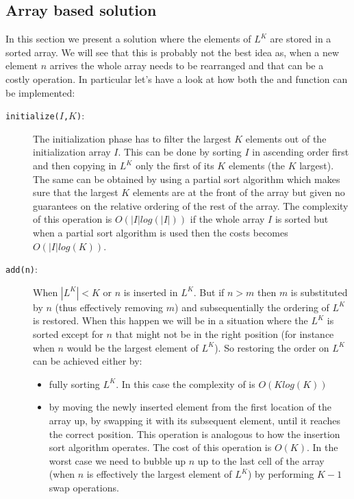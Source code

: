 \subsection{Array based solution}
\label{kth_largest_in_stream:sec:bruteforce}
In this section we present a solution where the elements of $L^K$ are stored in a sorted array. We
will see that this is probably not the best idea as, when a new element $n$ arrives the whole array
needs to be rearranged and that can be a costly operation. In particular let's have a look at how
both the  and  function can be implemented:
\begin{description}
	\item[\texttt{initialize($I$,$K$)}:] The initialization phase has to filter the largest $K$
	elements out of the initialization array $I$. This can be done by sorting $I$ in ascending order
	first  and then copying in $L^K$ only the first of its $K$ elements (the $K$ largest). The same
	can be obtained by using a partial sort algorithm which makes sure that  the largest $K$
	elements are at the front of the array but given no guarantees on the relative ordering of the
	rest of the array. The complexity of this operation is $O(|I| log(|I|))$ if the whole array $I$
	is sorted but when a partial sort algorithm is used then the costs becomes $O(|I| log(K))$.
	\item [\texttt{add(n)}:] When $|L^K|<K$ or  $n$ is inserted in $L^K$. But if $n>m$ then $m$ is
	 substituted by $n$ (thus effectively removing $m$) and subsequentially the ordering of $L^K$ is
	 restored. When this happen we will be in a situation where the $L^K$ is sorted except for $n$
	 that might not be in the right position (for instance when $n$ would be the largest element of
	 $L^K$). So restoring the order on $L^K$ can be achieved either by:
	 \begin{itemize}
		 \item fully sorting $L^K$. In this case the complexity of  is $O(K log(K))$
		 \item by moving the newly inserted element from the first location of the array up, by
		 swapping it with its subsequent element, until it reaches the correct position. This
		 operation is analogous to how the insertion sort algorithm operates. The cost of this
		 operation is $O(K)$. In the worst case we need to bubble up $n$ up to the last cell of the
		 array (when $n$ is effectively the largest element of $L^K$) by performing $K-1$ swap
		 operations.
	 \end{itemize}
\end{description}

